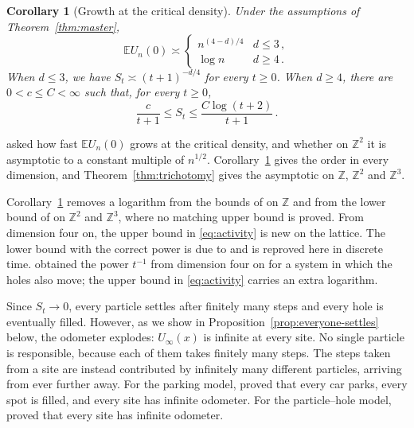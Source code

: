\documentclass[11pt]{amsart}
\theoremstyle{plain}
\newtheorem{corollary}[theorem]{Corollary}
\theoremstyle{definition}
\newcommand{\Z}{\mathbb{Z}}
\newcommand{\E}{\mathbb{E}}
\begin{document}
\begin{corollary}[Growth at the critical density]\label{cor:growth}
	Under the assumptions of Theorem~\ref{thm:master},
	\begin{equation}\label{eq:growth}
		\E U_n(0)\asymp
		\begin{cases}
			n^{(4-d)/4}&d\leq3\,,\\
			\log n&d\geq4\,.
		\end{cases}
	\end{equation}
	When $d\leq3$, we have $S_t\asymp (t+1)^{-d/4}$ for every $t\geq0$.
	When $d\geq4$, there are $0<c\leq C<\infty$ such that, for every $t\geq0$,
	\begin{equation}\label{eq:activity}
		\frac{c}{t+1}\leq S_t\leq\frac{C\log(t+2)}{t+1}\,.
	\end{equation}
\end{corollary}

\citet[Open Question~1]{DGJLS} asked how fast $\E U_n(0)$ grows at the critical density, and whether on $\Z^2$ it is asymptotic to a constant multiple of $n^{1/2}$. Corollary~\ref{cor:growth} gives the order in every dimension, and Theorem~\ref{thm:trichotomy} gives the asymptotic on $\Z$, $\Z^2$ and $\Z^3$.

Corollary~\ref{cor:growth} removes a logarithm from the bounds of \citet{PRS} on
$\Z$ and from the lower bound of \citet{JJLS} on $\Z^2$ and $\Z^3$, where no
matching upper bound is proved. From dimension four on, the upper bound in
\eqref{eq:activity} is new on the lattice. The lower bound with the correct
power is due to \citet{CRS} and is reproved here in discrete time. \citet{BL}
obtained the power $t^{-1}$ from dimension four on for a system in which the
holes also move; the upper bound in \eqref{eq:activity} carries an extra
logarithm.

Since $S_t\to0$, every particle settles after finitely many steps and every hole is eventually filled. However, as we show in
Proposition~\ref{prop:everyone-settles} below, the odometer explodes: $U_\infty(x)$ is infinite at every site. No single particle is responsible, because each of them takes finitely many steps. The steps taken from a site are instead contributed by infinitely many different particles, arriving from ever further away. For the parking model, \citet[Theorems~2.1
and~2.2]{DGJLS} proved that every car parks, every spot is filled, and every site has infinite odometer. For the particle--hole model, \citet[Theorem~6]{CRS14} proved that every site has infinite odometer.
\end{document}

